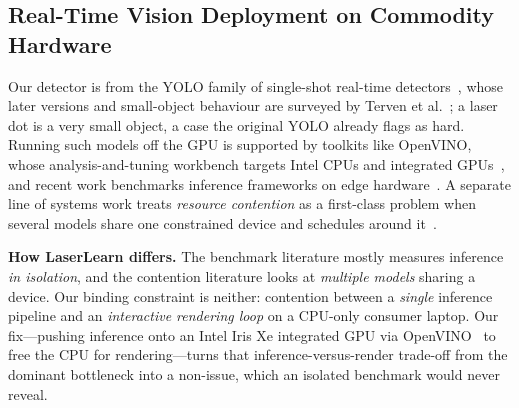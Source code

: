 \documentclass[conference]{IEEEtran}
\begin{document}
\subsection{Real-Time Vision Deployment on Commodity Hardware}
Our detector is from the YOLO family of single-shot real-time
detectors~\cite{redmon2016}, whose later versions and small-object behaviour are
surveyed by Terven et al.~\cite{terven2023}; a laser dot is a very small object,
a case the original YOLO already flags as hard. Running such models off the GPU is
supported by toolkits like OpenVINO, whose analysis-and-tuning workbench targets
Intel CPUs and integrated GPUs~\cite{gorbachev2019}, and recent work benchmarks
inference frameworks on edge hardware~\cite{edgeframeworks2025}. A separate line of
systems work treats \emph{resource contention} as a first-class problem when
several models share one constrained device and schedules around
it~\cite{edgecontention2022}.

\textbf{How LaserLearn differs.} The benchmark literature mostly measures
inference \emph{in isolation}, and the contention literature looks at
\emph{multiple models} sharing a device. Our binding constraint is neither:
contention between a \emph{single} inference pipeline and an \emph{interactive
rendering loop} on a CPU-only consumer laptop. Our fix---pushing inference onto an
Intel Iris Xe integrated GPU via OpenVINO~\cite{gorbachev2019} to free the CPU for
rendering---turns that inference-versus-render trade-off from the dominant
bottleneck into a non-issue, which an isolated benchmark would never reveal.

\end{document}

